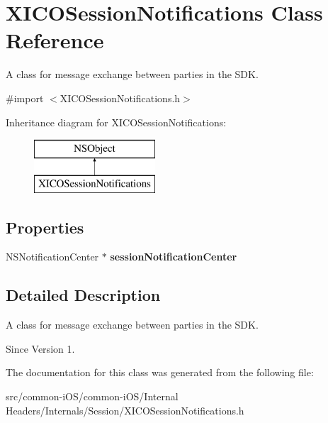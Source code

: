 \hypertarget{interface_x_i_c_o_session_notifications}{}\section{X\+I\+C\+O\+Session\+Notifications Class Reference}
\label{interface_x_i_c_o_session_notifications}


A class for message exchange between parties in the S\+DK.  




{\ttfamily \#import $<$X\+I\+C\+O\+Session\+Notifications.\+h$>$}

Inheritance diagram for X\+I\+C\+O\+Session\+Notifications\+:\begin{figure}[H]
\begin{center}
\leavevmode
\includegraphics[height=2.000000cm]{interface_x_i_c_o_session_notifications}
\end{center}
\end{figure}
\subsection*{Properties}
\begin{DoxyCompactItemize}
\item 
\hypertarget{interface_x_i_c_o_session_notifications_ab62b00de9c5227b49f9c6ccfce66e7ae}{}\label{interface_x_i_c_o_session_notifications_ab62b00de9c5227b49f9c6ccfce66e7ae} 
N\+S\+Notification\+Center $\ast$ {\bfseries session\+Notification\+Center}
\end{DoxyCompactItemize}


\subsection{Detailed Description}
A class for message exchange between parties in the S\+DK. 

\begin{DoxySince}{Since}
Version 1. 
\end{DoxySince}


The documentation for this class was generated from the following file\+:\begin{DoxyCompactItemize}
\item 
src/common-\/i\+O\+S/common-\/i\+O\+S/\+Internal Headers/\+Internals/\+Session/X\+I\+C\+O\+Session\+Notifications.\+h\end{DoxyCompactItemize}
